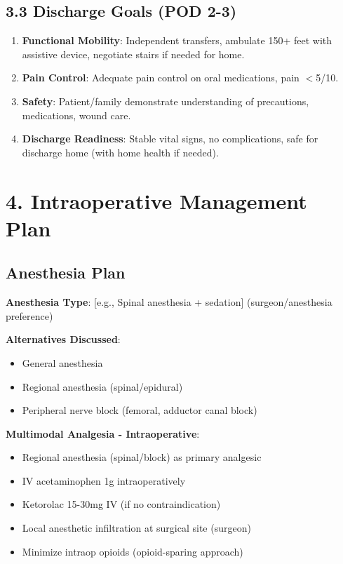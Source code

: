 \documentclass[11pt,letterpaper]{article}
\begin{document}
\subsection*{3.3 Discharge Goals (POD 2-3)}

\begin{enumerate}[leftmargin=*]
    \item \textbf{Functional Mobility}: Independent transfers, ambulate 150+ feet with assistive device, negotiate stairs if needed for home.
    
    \item \textbf{Pain Control}: Adequate pain control on oral medications, pain $<$5/10.
    
    \item \textbf{Safety}: Patient/family demonstrate understanding of precautions, medications, wound care.
    
    \item \textbf{Discharge Readiness}: Stable vital signs, no complications, safe for discharge home (with home health if needed).
\end{enumerate}

\section*{4. Intraoperative Management Plan}

\subsection*{Anesthesia Plan}

\textbf{Anesthesia Type}: [e.g., Spinal anesthesia + sedation] (surgeon/anesthesia preference)

\textbf{Alternatives Discussed}:
\begin{itemize}[leftmargin=*]
    \item General anesthesia
    \item Regional anesthesia (spinal/epidural)
    \item Peripheral nerve block (femoral, adductor canal block)
\end{itemize}

\textbf{Multimodal Analgesia - Intraoperative}:
\begin{itemize}[leftmargin=*]
    \item Regional anesthesia (spinal/block) as primary analgesic
    \item IV acetaminophen 1g intraoperatively
    \item Ketorolac 15-30mg IV (if no contraindication)
    \item Local anesthetic infiltration at surgical site (surgeon)
    \item Minimize intraop opioids (opioid-sparing approach)
\end{itemize}
\end{document}
